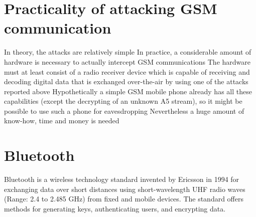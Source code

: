 \section{Practicality of attacking GSM communication}

In theory, the attacks are relatively simple
In practice, a considerable amount of hardware is necessary to actually intercept GSM communications
The hardware must at least consist of a radio receiver device which is capable of receiving and decoding digital data that is exchanged over-the-air by using one of the attacks reported above
Hypothetically a simple GSM mobile phone already has all these capabilities (except the decrypting of an unknown A5 stream), so it might be possible to use such a phone for eavesdropping
Nevertheless a huge amount of know-how, time and money is needed

\section{Bluetooth}
Bluetooth is a wireless technology standard invented by Ericsson in 1994 for exchanging data over short distances using short-wavelength UHF radio waves (Range: 2.4 to 2.485 GHz) from fixed and mobile devices.
The standard offers methods for generating keys, authenticating users, and encrypting data.




